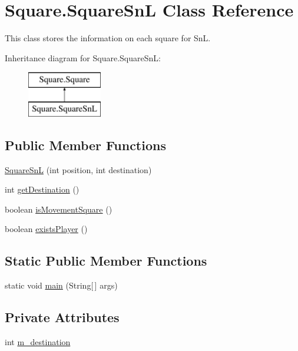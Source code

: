\hypertarget{class_square_1_1_square_sn_l}{}\section{Square.\+Square\+Sn\+L Class Reference}
\label{class_square_1_1_square_sn_l}


This class stores the information on each square for Sn\+L.  


Inheritance diagram for Square.\+Square\+Sn\+L\+:\begin{figure}[H]
\begin{center}
\leavevmode
\includegraphics[height=2.000000cm]{class_square_1_1_square_sn_l}
\end{center}
\end{figure}
\subsection*{Public Member Functions}
\begin{DoxyCompactItemize}
\item 
\hyperlink{class_square_1_1_square_sn_l_ac89482de8a579e2b2249f9d8bf652351}{Square\+Sn\+L} (int position, int destination)
\item 
int \hyperlink{class_square_1_1_square_sn_l_acb377b2ceb8dd5b8d65bba391f4c256d}{get\+Destination} ()
\item 
boolean \hyperlink{class_square_1_1_square_sn_l_ad948a877cff45a872082f23d72924770}{is\+Movement\+Square} ()
\item 
boolean \hyperlink{class_square_1_1_square_sn_l_a7f23505690a2a6ccfe9126448f66ddeb}{exists\+Player} ()
\end{DoxyCompactItemize}
\subsection*{Static Public Member Functions}
\begin{DoxyCompactItemize}
\item 
static void \hyperlink{class_square_1_1_square_sn_l_ac30c492a8a5c6f0f9bf43faa069dfa5c}{main} (String\mbox{[}$\,$\mbox{]} args)
\end{DoxyCompactItemize}
\subsection*{Private Attributes}
\begin{DoxyCompactItemize}
\item 
int \hyperlink{class_square_1_1_square_sn_l_a1906be8d7e5ea28a4b5b1585d820186f}{m\+\_\+destination}
\end{DoxyCompactItemize}
